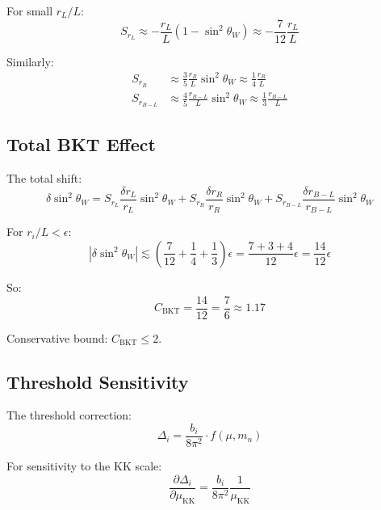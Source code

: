 \documentclass[11pt,a4paper]{article}
\begin{document}
For small $r_L/L$:
\begin{equation}
\label{eq:bkt-sens-approx}
S_{r_L} \approx -\frac{r_L}{L}(1-\sin^2\theta_W) \approx -\frac{7}{12}\frac{r_L}{L}
\end{equation}

Similarly:
\begin{align}
\label{eq:bkt-sens-R}
S_{r_R} &\approx \frac{3}{5}\frac{r_R}{L}\sin^2\theta_W \approx \frac{1}{4}\frac{r_R}{L} \\
\label{eq:bkt-sens-BL}
S_{r_{B-L}} &\approx \frac{4}{5}\frac{r_{B-L}}{L}\sin^2\theta_W \approx \frac{1}{3}\frac{r_{B-L}}{L}
\end{align}

\subsection{Total BKT Effect}
\label{subsec:total-bkt}

The total shift:
\begin{equation}
\label{eq:total-bkt-shift}
\delta\sin^2\theta_W = S_{r_L}\frac{\delta r_L}{r_L}\sin^2\theta_W + S_{r_R}\frac{\delta r_R}{r_R}\sin^2\theta_W + S_{r_{B-L}}\frac{\delta r_{B-L}}{r_{B-L}}\sin^2\theta_W
\end{equation}

For $r_i/L < \epsilon$:
\begin{equation}
\label{eq:bkt-bound-total}
|\delta\sin^2\theta_W| \lesssim \left(\frac{7}{12} + \frac{1}{4} + \frac{1}{3}\right)\epsilon = \frac{7 + 3 + 4}{12}\epsilon = \frac{14}{12}\epsilon
\end{equation}

So:
\begin{equation}
\label{eq:C-BKT-derived}
C_{\text{BKT}} = \frac{14}{12} = \frac{7}{6} \approx 1.17
\end{equation}

Conservative bound: $C_{\text{BKT}} \leq 2$.

\subsection{Threshold Sensitivity}
\label{subsec:threshold-sensitivity}

The threshold correction:
\begin{equation}
\label{eq:threshold-sens}
\Delta_i = \frac{b_i}{8\pi^2}\cdot f(\mu, m_n)
\end{equation}

For sensitivity to the KK scale:
\begin{equation}
\label{eq:mu-kk-sensitivity}
\frac{\partial\Delta_i}{\partial\mu_{\text{KK}}} = \frac{b_i}{8\pi^2}\frac{1}{\mu_{\text{KK}}}
\end{equation}
\end{document}
